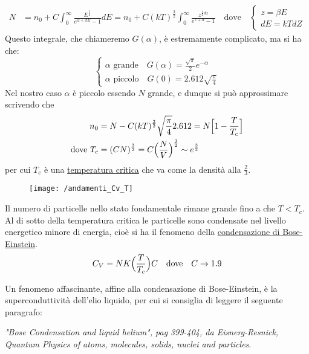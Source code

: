 \begin{equation}
\begin{split}
N & = n_0 + C \int_0^{\infty} \frac{ E^{ \frac{ 1}{2 } }}{e^{\alpha + \beta E } -1 }dE = n_0 + C (kT)^{ \frac{ 3}{2 } } \int_0^{\infty} \frac{ z^{\frac{ 1}{2 } dz}}{e^{z+\alpha } - 1} \quad
\mbox{dove} \quad
\begin{cases}
	z = \beta E \\
	dE = k T dZ
\end{cases}
\end{split}
\end{equation}
Questo integrale, che chiameremo $G(\alpha)$, è estremamente complicato, ma si ha che:
\begin{equation}
\begin{cases}
	\alpha \mbox{ grande} \quad G(\alpha) = \frac{ \sqrt{\pi}}{2 } e^{ - \alpha } \\
	\alpha \mbox{ piccolo} \quad G(0) = 2.612 \sqrt{\frac{ \pi}{4 }}
\end{cases}
\end{equation}
Nel nostro caso $\alpha$ è piccolo essendo $N$ grande, e dunque si può approssimare scrivendo che 
\begin{equation}
\begin{split}
	n_0 & = N - C (kT)^{ \frac{ 3}{2 } } \sqrt{\frac{ \pi}{4 }} 2.612 = N \Bigl[ 1 - \frac{ T}{T_c } \Bigr] \\
	\mbox{dove } T_c & = (CN)^{ \frac{ 3}{2 } }  = C \Bigl(  \frac{ N}{V }  \Bigr)^{ \frac{ 3}{2 } } \sim e^{ \frac{ 3}{2 } } 
\end{split}
\end{equation}
per cui $T_c$ è una \underline{temperatura critica} che va come la densità alla $\frac{ 2}{3 }$.

	\newpage

\begin{figure}[h]
\centering
\texttt{[image: /andamenti\_Cv\_T]}
\end{figure}
Il numero di particelle nello stato fondamentale rimane grande fino a che $T < T_c$.
Al di sotto della temperatura critica le particelle sono condensate nel livello energetico minore di energia, cioè si ha il fenomeno della \underline{condensazione di Bose-Einstein}.
\begin{equation}
C_V = N K \Bigl(  \frac{ T}{T_c }  \Bigr) C \quad \mbox{dove} \quad C \to 1.9
\end{equation} 

Un fenomeno affascinante, affine alla condensazione di Bose-Einstein, è la superconduttività dell'elio liquido, per cui si consiglia di leggere il seguente paragrafo:

\textit{"Bose Condensation and liquid helium", pag 399-404, da Eisnerg-Resnick, Quantum Physics of atoms, molecules, solids, nuclei and particles}.


